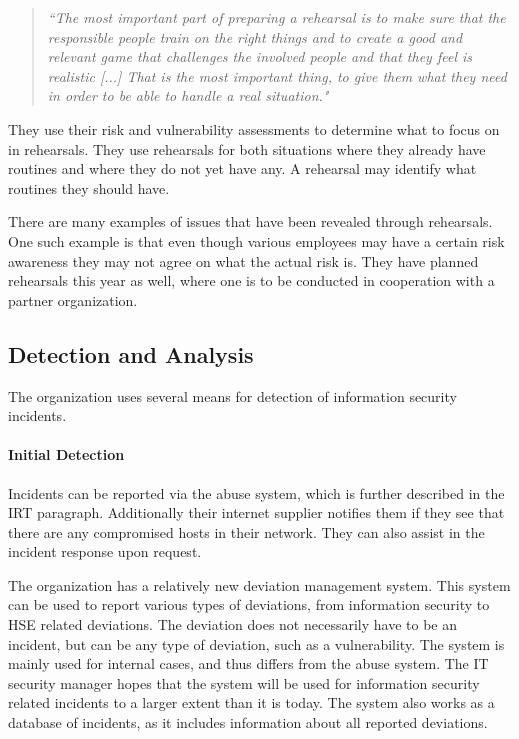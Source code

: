 \begin{quote}
\textit{``The most important part of preparing a rehearsal is to make sure that the responsible people train on the right things and to create a good and relevant game that challenges the involved people and that they feel is realistic [...] That is the most important thing, to give them what they need in order to be able to handle a real situation."}
\end{quote}

They use their risk and vulnerability assessments to determine what to focus on in rehearsals. They use rehearsals for both situations where they already have routines and where they do not yet have any. A rehearsal may identify what routines they should have.

There are many examples of issues that have been revealed through rehearsals. One such example is that even though various employees may have a certain risk awareness they may not agree on what the actual risk is. They have planned rehearsals this year as well, where one is to be conducted in cooperation with a partner organization. %

\subsection{Detection and Analysis}
The organization uses several means for detection of information security incidents.

\paragraph{Initial Detection}
Incidents can be reported via the abuse system, which is further described in the \ac{IRT} paragraph. Additionally their internet supplier notifies them if they see that there are any compromised hosts in their network. They can also assist in the incident response upon request.

The organization has a relatively new deviation management system. This system can be used to report various types of deviations, from information security to \ac{HSE} related deviations. The deviation does not necessarily have to be an incident, but can be any type of deviation, such as a vulnerability. The system is mainly used for internal cases, and thus differs from the abuse system. The IT security manager hopes that the system will be used for information security related incidents to a larger extent than it is today. The system also works as a database of incidents, as it includes information about all reported deviations.  

